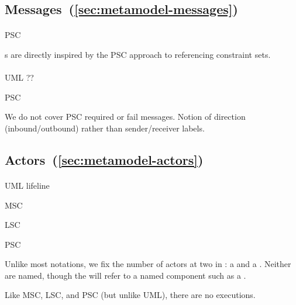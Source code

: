 \subsection{Messages~(\ref{sec:metamodel-messages})}

\paragraph{\mmessageset}
\begin{featset}
\item[PSC] 
\end{featset}

\mrefmessageset s are directly inspired by the PSC approach to referencing constraint sets.

\paragraph{\mmessagespec}
\begin{featset}
\item[UML] ??
\item[PSC] 
\end{featset}

We do not cover PSC required or fail messages.
Notion of direction (inbound/outbound) rather than sender/receiver labels.

\subsection{Actors~(\ref{sec:metamodel-actors})}

\paragraph{\mactor}
\begin{featset}
\item[UML] lifeline
\item[MSC] 
\item[LSC] 
\item[PSC] 
\end{featset}

Unlike most notations, we fix the number of actors at two
 in \langname: a \mtarget{} and a \mworld{}.
Neither are named, though the \mtarget{} will refer to a
named component such as a \mrcmodule.

Like MSC, LSC, and PSC (but unlike UML), there are no executions.

